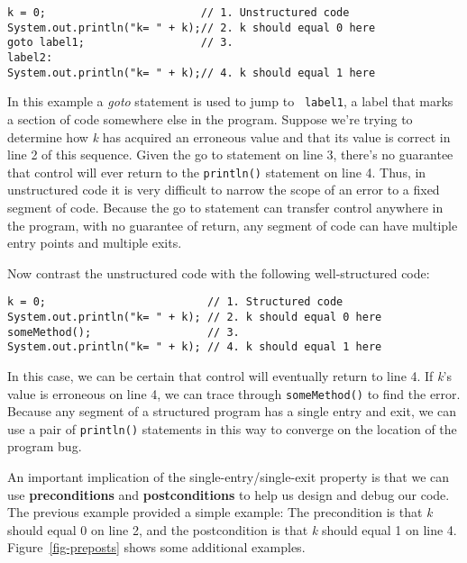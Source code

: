 \begin{jjjlisting}
\begin{lstlisting}
k = 0;                        // 1. Unstructured code
System.out.println("k= " + k);// 2. k should equal 0 here
goto label1;                  // 3.
label2:
System.out.println("k= " + k);// 4. k should equal 1 here
\end{lstlisting}
\end{jjjlisting}

\noindent 
In this example a {\it goto} statement is used to jump to {\tt
label1}, a label that marks a section of code somewhere else in the
program. Suppose we're trying to determine how {\it k} has acquired an
erroneous value and that its value is correct in line 2 of this
sequence. Given the go to statement on line 3, there's no guarantee
that control will ever return to the {\tt println()} statement on line
4. Thus, in unstructured code it is very difficult to narrow the scope
of an error to a fixed segment of code. Because the go to statement
can transfer control anywhere in the program, with no guarantee of
return, any segment of code can have multiple entry points and
multiple exits.

Now contrast the unstructured code with the following well-structured code:


\begin{jjjlisting}
\begin{lstlisting}
k = 0;                         // 1. Structured code
System.out.println("k= " + k); // 2. k should equal 0 here
someMethod();                  // 3.
System.out.println("k= " + k); // 4. k should equal 1 here
\end{lstlisting}
\end{jjjlisting}

\noindent In this case, we can be certain that control will eventually
return to line 4. If {\it k}'s value is erroneous on line 4, we can trace
through {\tt someMethod()} to find the error. Because any segment
of a structured program has a single entry and exit, we can use
a pair of {\tt println()} statements in this way to converge
on the location of the program bug.

An important implication of the single-entry/single-exit property is
that we can use {\bf preconditions} and {\bf postconditions} to help
us design and debug our code. The previous example provided a simple
example: The precondition is that {\it k} should equal 0 on line 2,
and the postcondition is that {\it k} should equal 1 on line
4. Figure~\ref{fig-preposts} shows some additional examples.

